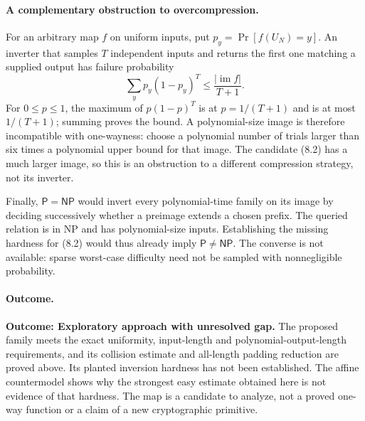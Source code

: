 \documentclass[11pt,a4paper]{article}
\begin{document}
\paragraph{A complementary obstruction to overcompression.}
For an arbitrary map $f$ on uniform inputs, put
$p_y=\Pr[f(U_N)=y]$. An inverter that samples $T$ independent inputs and
returns the first one matching a supplied output has failure probability
\[
 \sum_y p_y(1-p_y)^T\le \frac{|\operatorname{im}f|}{T+1}.
 \tag{8.4}
\]
For $0\le p\le1$, the maximum of $p(1-p)^T$ is at $p=1/(T+1)$ and is
at most $1/(T+1)$; summing proves the bound. A polynomial-size image is
therefore incompatible with one-wayness: choose a polynomial number of
trials larger than six times a polynomial upper bound for that image.
The candidate (8.2) has a much larger image, so this is an obstruction
to a different compression strategy, not its inverter.

Finally, $\mathsf P=\mathsf{NP}$ would invert every polynomial-time
family on its image by deciding successively whether a preimage extends
a chosen prefix. The queried relation is in NP and has polynomial-size
inputs. Establishing the missing hardness for (8.2) would thus already
imply $\mathsf P\ne\mathsf{NP}$. The converse is not available: sparse
worst-case difficulty need not be sampled with nonnegligible probability.

\paragraph{Outcome.}
\textbf{Outcome: Exploratory approach with unresolved gap.}
The proposed family meets the exact uniformity, input-length and
polynomial-output-length requirements, and its collision estimate and
all-length padding reduction are proved above. Its planted inversion
hardness has not been established. The affine countermodel shows why
the strongest easy estimate obtained here is not evidence of that
hardness. The map is a candidate to analyze, not a proved one-way
function or a claim of a new cryptographic primitive.
\end{document}
